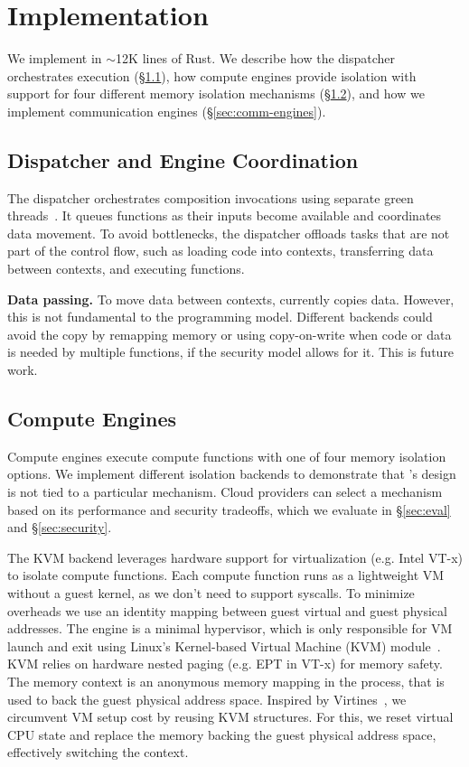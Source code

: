 \section{Implementation}\label{sec:impl}

We implement \dandelion in $\sim$12K lines of Rust.
We describe how the dispatcher orchestrates execution (\S\ref{sec:dispatcher-impl}), how compute engines provide isolation with support for four different memory isolation mechanisms (\S\ref{impl:compute-engine}), and how we implement communication engines (\S\ref{sec:comm-engines}). 

\subsection{Dispatcher and Engine Coordination}\label{sec:dispatcher-impl}

The dispatcher orchestrates composition invocations using separate green threads~\cite{rust:green-threads}. It queues functions as their inputs become available and coordinates data movement.
To avoid bottlenecks, the dispatcher offloads tasks that are not part of the control flow, such as loading code into contexts, transferring data between contexts, and executing functions.

\textbf{Data passing.} 
To move data between contexts, \dandelion currently copies data. However, this is not fundamental to the programming model.
Different backends could avoid the copy by remapping memory or using copy-on-write when code or data is needed by multiple functions, if the security model allows for it. This is future work.

\subsection{Compute Engines}\label{impl:compute-engine}

Compute engines execute compute functions with one of four memory isolation options. We implement different isolation backends to demonstrate that \dandelion's design is not tied to a particular mechanism. 
Cloud providers can select a mechanism based on its performance and security tradeoffs, which we evaluate in \S\ref{sec:eval} and \S\ref{sec:security}.

The KVM backend leverages hardware support for virtualization (e.g. Intel VT-x) to isolate compute functions.
Each compute function runs as a lightweight VM without a guest kernel, as we don't need to support syscalls.
To minimize overheads we use an identity mapping between guest virtual and guest physical addresses.
The engine is a minimal hypervisor, which is only responsible for VM launch and exit using Linux's Kernel-based Virtual Machine (KVM) module~\cite{kvm}.
KVM relies on hardware nested paging (e.g. EPT in VT-x) for memory safety.
The memory context is an anonymous memory mapping in the \dandelion process, that is used to back the guest physical address space.
Inspired by Virtines~\cite{virtines}, we circumvent VM setup cost by reusing KVM structures. For this, we reset virtual CPU state and replace the memory backing the guest physical address space, effectively switching the context.

